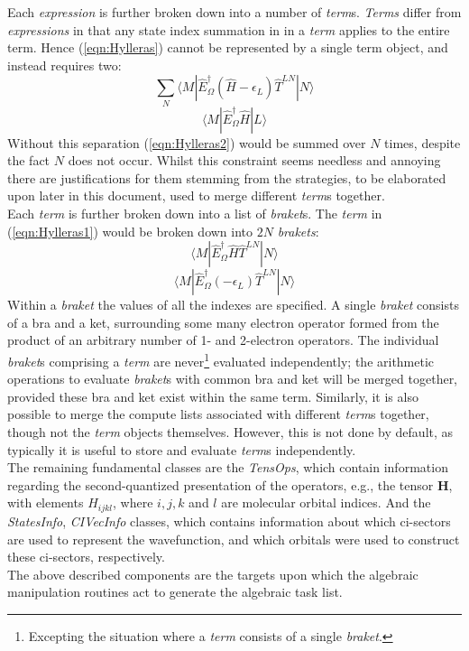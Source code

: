 \noindent Each \emph{expression} is further broken down into a number of \emph{term}s.
\emph{Terms} differ from \emph{expressions} in that any state index summation in
in a \emph{term} applies to the entire term.
Hence (\ref{eqn:Hylleras}) cannot be represented by a single term object, and instead
requires two:
\begin{equation}
\sum_{N} 
\langle M | \hat{E}^{\dagger}_{\Omega} (\hat{H}-\epsilon_{L}) \hat{T}^{LN} | N \rangle  
\label{eqn:Hylleras1}
\end{equation}
\begin{equation}
\langle M | \hat{E}^{\dagger}_{\Omega} \hat{H} | L  \rangle  
\label{eqn:Hylleras2}
\end{equation}
\noindent Without this separation (\ref{eqn:Hylleras2}) would be summed over $N$ times,
despite the fact $N$ does not occur. 
Whilst this constraint seems needless and annoying there are justifications for them stemming
from the strategies, to be elaborated upon later in this document, used to merge different \emph{term}s together. \\ 

\noindent Each \emph{term} is further broken down into a list of \emph{braket}s. The \emph{term} 
in (\ref{eqn:Hylleras1}) would be broken down into $2N$ \emph{brakets}: 
\begin{equation}
\langle M | \hat{E}^{\dagger}_{\Omega} \hat{H} \hat{T}^{LN} | N \rangle  
\end{equation}
\begin{equation}
\langle M | \hat{E}^{\dagger}_{\Omega} (-\epsilon_{L}) \hat{T}^{LN} | N \rangle  
\end{equation}
\noindent Within a \emph{braket} the values of all the indexes are specified.
A single \emph{braket} consists of a bra and a ket, surrounding some many electron 
operator formed from the product of an arbitrary number of 1- and 2-electron operators.  The
individual \emph{braket}s comprising a \emph{term} are never\footnote{Excepting
the situation where a \emph{term} consists of a single \emph{braket}.}
evaluated independently; the arithmetic operations to evaluate \emph{braket}s
with common bra and ket will be merged together, provided these bra and ket
exist within the same term. Similarly, it is also possible to merge the compute
lists associated with different \emph{term}s together, though not the
\emph{term} objects themselves. However, this is not done by default, as
typically it is useful to store and evaluate \emph{term}s independently.\\

\noindent The remaining fundamental classes are the \emph{TensOps}, which contain
information regarding the second-quantized presentation of the operators, e.g.,
the tensor $\mathbf{H}$, with elements $H_{ijkl}$, where $i, j, k$ and $l$ are
molecular orbital indices. And the \emph{StatesInfo}, \emph{CIVecInfo}
classes, which contains information about which ci-sectors are used to represent the 
wavefunction, and which orbitals were used to construct these ci-sectors,  respectively.\\

\noindent The above described components are the targets upon which the 
algebraic manipulation routines act to generate the algebraic task list.  
